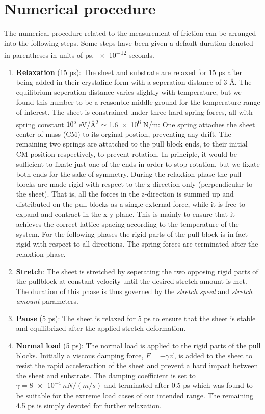 \section{Numerical procedure}
The numerical procedure related to the measurement of friction can be arranged
into the following steps. Some steps have been given a default duration
denoted in parentheses in units of ps, \num{e-12} seconds.
\begin{enumerate}
  \item \textbf{Relaxation} (15 ps): The sheet and substrate are relaxed for 15 ps after being added in their crystaline form with a seperation distance of 3 Å. The equilibrium seperation distance varies slightly with temperature, but we found this number to be a reasonble middle ground for the temperature range of interest. The sheet is
  constrained under three hard spring forces, all with spring constant $10^5$
  eV/Å$^2$ $\sim$ \num{1.6e6} N/m: One spring attaches the sheet center of mass
  (\acrshort{CM}) to its orginal postion, preventing any drift. The
  remaining two springs are attatched to the pull block ends, to their initial \acrshort{CM} position respectively, to prevent rotation. In principle, it would be sufficient to fixate just one of the ends in order to stop rotation, but we fixate both ends for the sake of symmetry. During the
  relaxtion phase the pull blocks are made rigid with respect to the z-direction
  only (perpendicular to the sheet). That is, all the forces in the z-direction
  is summed up and distributed on the pull blocks as a single external force, while it is free to expand and
  contract in the x-y-plane. This is mainly to ensure that it achieves the
  correct lattice spacing according to the temperature of the system. For the following phases the rigid parts of the pull block is in fact rigid with
  respect to all directions. The spring forces are terminated after the relaxtion phase. 
  \item \textbf{Stretch}: The sheet is stretched by seperating the two opposing rigid parts of the pullblock at constant velocity until the desired stretch amount is met. The duration of this phase is thus governed by the  \textit{stretch speed} and \textit{stretch amount} parameters. 
  \item \textbf{Pause} (5 ps): The sheet is relaxed for 5 ps to ensure that the sheet is stable and equilibrized after the applied stretch deformation. 
  \item \textbf{Normal load} (5 ps): The normal load is applied to the rigid
  parts of the pull blocks. Initially a viscous damping force, $F = -\gamma \vec{v}$, is added to the sheet to resist the rapid acceleraction of the sheet and prevent a hard impact between the sheet and substrate. The damping coefficient is set to $\gamma = \SI{8e-4}{nN/(m/s)}$ and terminated after 0.5 ps which was found to be suitable for the extreme load cases of our intended range. The remaining 4.5 ps is simply devoted for further relaxation. 

\end{enumerate}
